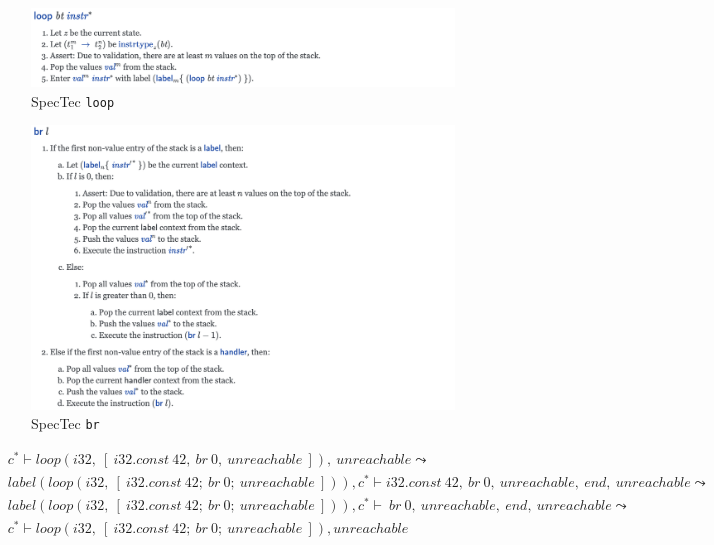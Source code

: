 \begin{figure}[h!]
    \centerline{\includegraphics[width=15cm]{fig/spectec-loop}}
    \caption[Enter the caption title here]{SpecTec \texttt{loop}} \label{fig:spectec-loop}
\end{figure}
\begin{figure}[h!]
    \centerline{\includegraphics[width=15cm]{fig/spectec-br}}
    \caption[Enter the caption title here]{SpecTec \texttt{br}} \label{fig:spectec-br}
\end{figure}

\begin{align}
  &c^*
  \vdash
  loop(i32, ~ [ ~ i32.const ~ 42, ~ br ~ 0, ~ unreachable ~ ]), ~ unreachable
  \label{eq:loop-1}
\leadsto \\
  &label(loop(i32, ~ [ ~ i32.const ~ 42; ~ br ~ 0; ~ unreachable ~ ])), c^*
  \vdash
  i32.const ~ 42, ~ br ~ 0, ~ unreachable, ~ end, ~ unreachable
  \label{eq:loop-2}
\leadsto \\
  &label(loop(i32, ~ [ ~ i32.const ~ 42; ~ br ~ 0; ~ unreachable ~ ])), c^*
  \vdash
  ~ br ~ 0, ~ unreachable, ~ end, ~ unreachable
  \label{eq:loop-3}
\leadsto \\
  &c^*
  \vdash
  loop(i32, ~ [ ~ i32.const ~ 42; ~ br ~ 0; ~ unreachable ~ ]), unreachable \\
  \label{eq:loop-4}
\end{align}

